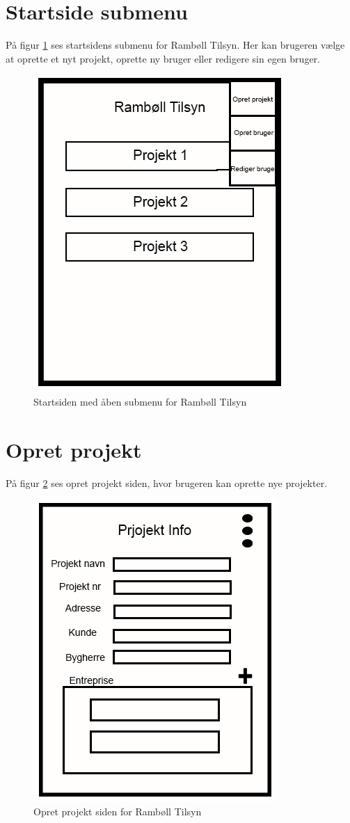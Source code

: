 \section{Startside submenu}\label{sec:StartSubMock}
På figur \ref{fig:StartSubMock} ses startsidens submenu for Rambøll Tilsyn. Her kan brugeren vælge at oprette et nyt projekt, oprette ny bruger eller redigere sin egen bruger.

\begin{figure}[H]
	\centering
	\includegraphics[width=0.4\linewidth]{MockUps/Mock/Ramboell-Startside-Sub}
	\caption{Startsiden med åben submenu for Rambøll Tilsyn}
	\label{fig:StartSubMock}
\end{figure}

\clearpage

\section{Opret projekt}\label{sec:OpretProjektMock}
På figur \ref{fig:OpretProjektMock} ses opret projekt siden, hvor brugeren kan oprette nye projekter.

\begin{figure}[H]
	\centering
	\includegraphics[width=0.4\linewidth]{MockUps/Mock/Ramboell-ProjektInfo}
	\caption{Opret projekt siden for Rambøll Tilsyn}
	\label{fig:OpretProjektMock}
\end{figure}

